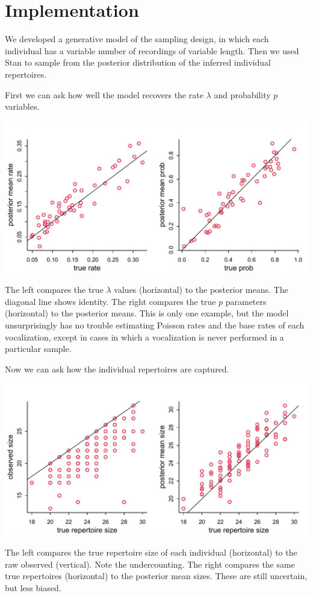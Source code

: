 \documentclass[reqno ,11pt]{amsart}
\begin{document}
\section{Implementation}

We developed a generative model of the sampling design, in which each individual has a variable number of recordings of variable length. Then we used Stan to sample from the posterior distribution of the inferred individual repertoires.

First we can ask how well the model recovers the rate $\lambda$ and probability $p$ variables.
\begin{center}
	\includegraphics[scale=0.6]{fig_lambda_p.pdf}
\end{center}
The left compares the true $\lambda$ values (horizontal) to the posterior means. The diagonal line shows identity. The right compares the true $p$ parameters (horizontal) to the posterior means. 
This is only one example, but the model unsurprisingly has no trouble estimating Poisson rates and the base rates of each vocalization, except in cases in which a vocalization is never performed in a particular sample.

Now we can ask how the individual repertoires are captured.
\begin{center}
	\includegraphics[scale=0.6]{fig_repertoires.pdf}
\end{center}
The left compares the true repertoire size of each individual (horizontal) to the raw observed (vertical). Note the undercounting. The right compares the same true repertoires (horizontal) to the posterior mean sizes. These are still uncertain, but less biased.
\end{document}
